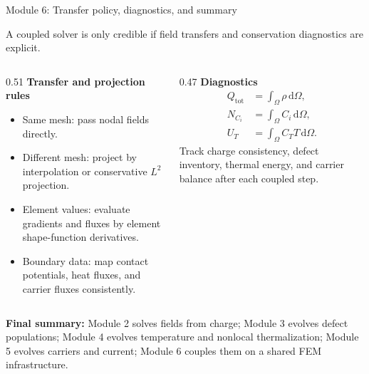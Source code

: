 \documentclass[aspectratio=169,9pt]{beamer}
\newcommand{\dd}{\,\mathrm{d}}
\begin{document}
\begin{frame}{Module 6: Transfer policy, diagnostics, and summary}
\footnotesize
\vspace{-3mm}
\begin{bluebox}
\centering
A coupled solver is only credible if field transfers and conservation diagnostics are explicit.
\end{bluebox}

\vspace{1mm}
\begin{columns}[T,totalwidth=\textwidth]
\begin{column}{0.51\textwidth}
\textbf{Transfer and projection rules}
\begin{itemize}\setlength\itemsep{0.45mm}
\item Same mesh: pass nodal fields directly.
\item Different mesh: project by interpolation or conservative \(L^2\) projection.
\item Element values: evaluate gradients and fluxes by element shape-function derivatives.
\item Boundary data: map contact potentials, heat fluxes, and carrier fluxes consistently.
\end{itemize}
\end{column}
\begin{column}{0.47\textwidth}
\textbf{Diagnostics}
\begin{align*}
Q_{\mathrm{tot}}&=\int_{\Omega}\rho\dd\Omega,\\
N_{C_i}&=\int_{\Omega}C_i\dd\Omega,\\
U_T&=\int_{\Omega}C_TT\dd\Omega.
\end{align*}
\small
Track charge consistency, defect inventory, thermal energy, and carrier balance after each coupled step.
\end{column}
\end{columns}

\vspace{1mm}
\begin{greenbox}
\small
\textbf{Final summary:} Module 2 solves fields from charge; Module 3 evolves defect populations; Module 4 evolves temperature and nonlocal thermalization; Module 5 evolves carriers and current; Module 6 couples them on a shared FEM infrastructure.
\end{greenbox}
\end{frame}
\end{document}
